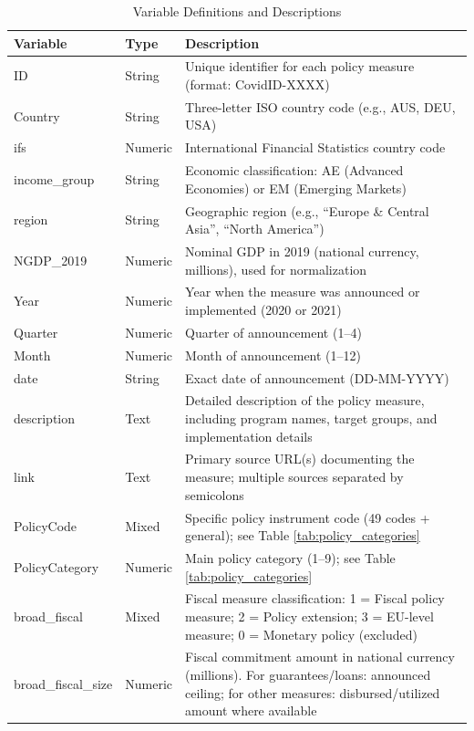 \documentclass[12pt]{article}
\begin{document}
\begin{table}[H]
\caption{Variable Definitions and Descriptions}
\label{tab:variables}
\scriptsize
\begin{threeparttable}
\begin{tabular}{@{}p{3cm}p{2cm}p{12cm}@{}}
\toprule
\textbf{Variable} & \textbf{Type} & \textbf{Description} \\
\midrule
ID & String & Unique identifier for each policy measure (format: CovidID-XXXX) \\
\addlinespace
Country & String & Three-letter ISO country code (e.g., AUS, DEU, USA) \\
\addlinespace
ifs & Numeric & International Financial Statistics country code \\
\addlinespace
income\_group & String & Economic classification: AE (Advanced Economies) or EM (Emerging Markets) \\
\addlinespace
region & String & Geographic region (e.g., ``Europe \& Central Asia'', ``North America'') \\
\addlinespace
NGDP\_2019 & Numeric & Nominal GDP in 2019 (national currency, millions), used for normalization \\
\addlinespace
Year & Numeric & Year when the measure was announced or implemented (2020 or 2021) \\
\addlinespace
Quarter & Numeric & Quarter of announcement (1--4) \\
\addlinespace
Month & Numeric & Month of announcement (1--12) \\
\addlinespace
date & String & Exact date of announcement (DD-MM-YYYY) \\
\addlinespace
description & Text & Detailed description of the policy measure, including program names, target groups, and implementation details \\
\addlinespace
link & Text & Primary source URL(s) documenting the measure; multiple sources separated by semicolons \\
\addlinespace
PolicyCode & Mixed & Specific policy instrument code (49 codes + general); see Table \ref{tab:policy_categories} \\
\addlinespace
PolicyCategory & Numeric & Main policy category (1--9); see Table \ref{tab:policy_categories} \\
\addlinespace
broad\_fiscal & Mixed & Fiscal measure classification: 1 = Fiscal policy measure; 2 = Policy extension; 3 = EU-level measure; 0 = Monetary policy (excluded) \\
\addlinespace
broad\_fiscal\_size & Numeric & Fiscal commitment amount in national currency (millions). For guarantees/loans: announced ceiling; for other measures: disbursed/utilized amount where available \\

\end{tabular}
\end{threeparttable}
\end{table}
\end{document}
